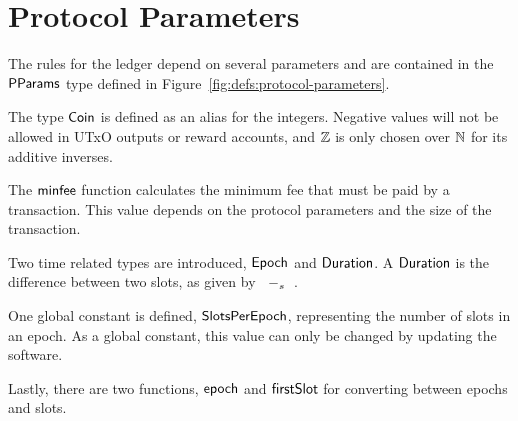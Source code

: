 \section{Protocol Parameters}
\label{sec:protocol-parameters}

The rules for the ledger depend on several parameters and are contained in the $\mathsf{PParams}$ type
defined in Figure~\ref{fig:defs:protocol-parameters}.

The type $\mathsf{Coin}$ is defined as an alias for the integers.
Negative values will not be allowed in UTxO outputs or reward accounts,
and $\mathbb{Z}$ is only chosen over $\mathbb{N}$ for its additive inverses.

The $\mathsf{minfee}$ function calculates the minimum fee that must be paid by a transaction.
This value depends on the protocol parameters and the size of the transaction.

Two time related types are introduced, $\mathsf{Epoch}$ and $\mathsf{Duration}$.
A $\mathsf{Duration}$ is the difference between two slots, as given by $\mathit{}~-_{s}~\mathit{}$.

One global constant is defined, $\mathsf{SlotsPerEpoch}$, representing the number of slots
in an epoch. As a global constant, this value can only be changed by updating the software.

Lastly, there are two functions, $\mathsf{epoch}$ and $\mathsf{firstSlot}$ for converting
between epochs and slots.

